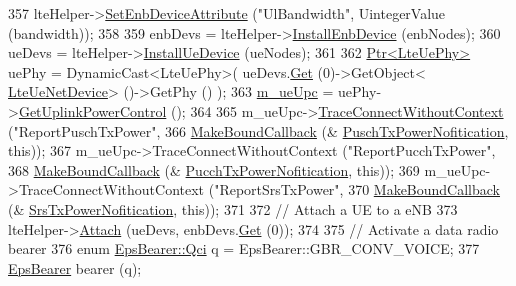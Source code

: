 \begin{DoxyCode}
357   lteHelper->\hyperlink{classns3_1_1LteHelper_ac42f0f3d6cd8473d810bfbbeb5d592e0}{SetEnbDeviceAttribute} (\textcolor{stringliteral}{"UlBandwidth"}, UintegerValue (bandwidth));
358 
359   enbDevs = lteHelper->\hyperlink{classns3_1_1LteHelper_a5e009ad35ef85f46b5a6099263f15a03}{InstallEnbDevice} (enbNodes);
360   ueDevs = lteHelper->\hyperlink{classns3_1_1LteHelper_ac9cd932d7de92811cfa953c2e3b2fc9f}{InstallUeDevice} (ueNodes);
361 
362   \hyperlink{classns3_1_1Ptr}{Ptr<LteUePhy>} uePhy = DynamicCast<LteUePhy>( ueDevs.\hyperlink{classns3_1_1NetDeviceContainer_a677d62594b5c9d2dea155cc5045f4d0b}{Get} (0)->GetObject<
      \hyperlink{classns3_1_1LteUeNetDevice}{LteUeNetDevice}> ()->GetPhy () );
363   \hyperlink{classLteUplinkPowerControlTestCase_af2fabece7259e4b60cc73d7ec02b7a3d}{m\_ueUpc} = uePhy->\hyperlink{classns3_1_1LteUePhy_a386b038c79252c3fe8408e68279fa88b}{GetUplinkPowerControl} ();
364 
365   m\_ueUpc->\hyperlink{classns3_1_1ObjectBase_a1be45f6fd561e75dcac9dfa81b2b81e4}{TraceConnectWithoutContext} (\textcolor{stringliteral}{"ReportPuschTxPower"},
366                                        \hyperlink{group__makeboundcallback_ga1725d6362e6065faa0709f7c93f8d770}{MakeBoundCallback} (&
      \hyperlink{lte-test-uplink-power-control_8cc_a2236a3f87ff177b3305bf82ff492f8ad}{PuschTxPowerNofitication}, \textcolor{keyword}{this}));
367   m\_ueUpc->TraceConnectWithoutContext (\textcolor{stringliteral}{"ReportPucchTxPower"},
368                                        \hyperlink{group__makeboundcallback_ga1725d6362e6065faa0709f7c93f8d770}{MakeBoundCallback} (&
      \hyperlink{lte-test-uplink-power-control_8cc_a4a348fa3ab0a4e65de2ddb70fe0176e3}{PucchTxPowerNofitication}, \textcolor{keyword}{this}));
369   m\_ueUpc->TraceConnectWithoutContext (\textcolor{stringliteral}{"ReportSrsTxPower"},
370                                        \hyperlink{group__makeboundcallback_ga1725d6362e6065faa0709f7c93f8d770}{MakeBoundCallback} (&
      \hyperlink{lte-test-uplink-power-control_8cc_acc0b838be35884288e3872794ca2903d}{SrsTxPowerNofitication}, \textcolor{keyword}{this}));
371 
372   \textcolor{comment}{// Attach a UE to a eNB}
373   lteHelper->\hyperlink{classns3_1_1LteHelper_a9466743f826aa2652a87907b7f0a1c87}{Attach} (ueDevs, enbDevs.\hyperlink{classns3_1_1NetDeviceContainer_a677d62594b5c9d2dea155cc5045f4d0b}{Get} (0));
374 
375   \textcolor{comment}{// Activate a data radio bearer}
376   \textcolor{keyword}{enum} \hyperlink{structns3_1_1EpsBearer_aecf0c67109c5eb4ec0b07226fff5885e}{EpsBearer::Qci} q = EpsBearer::GBR\_CONV\_VOICE;
377   \hyperlink{structns3_1_1EpsBearer}{EpsBearer} bearer (q);

\end{DoxyCode}
